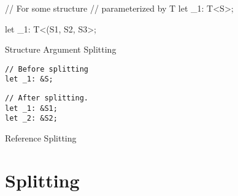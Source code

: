 \documentclass[12pt,oneside]{book}
\begin{document}
\begin{listing*}[p]
  \begin{minipage}[t]{0.5\linewidth}
\begin{listing}
// For some structure 
// parameterized by T
let \_1: T<S>;
\end{listing}
  \end{minipage}
  \begin{minipage}[t]{0.5\linewidth}
\begin{listing}

let \_1: T<(S1, S2, S3>;
\end{listing}
  \end{minipage}
  \caption{Structure Argument Splitting}
  \label{fig:localdeclbefore}
\end{listing*}



  
\begin{listing*}
  \begin{minipage}[t]{0.5\linewidth}
\begin{verbatim}
// Before splitting
let _1: &S;
\end{verbatim}
  \end{minipage}
  \begin{minipage}[t]{0.5\linewidth}
\begin{verbatim}
// After splitting.
let _1: &S1;
let _2: &S2;
\end{verbatim}
  \end{minipage}
  \caption{Reference Splitting}
  \label{fig:refedecl}
\end{listing*}

\section{Splitting}
\label{sec:splitting}
\end{document}

